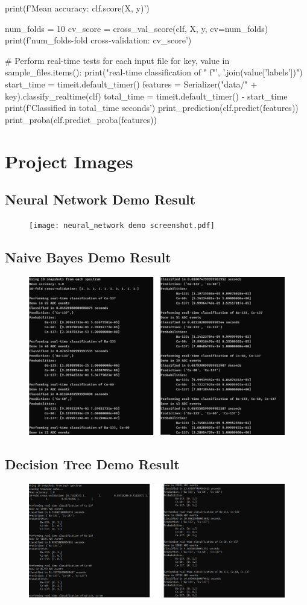 \documentclass[onecolumn, draftclsnofoot,10pt, compsoc]{IEEEtran}
\begin{document}
\begin{python}
print(f'Mean accuracy: {clf.score(X, y)}')

num_folds = 10
cv_score = cross_val_score(clf, X, y, cv=num_folds)
print(f'{num_folds}-fold cross-validation: {cv_score}')

# Perform real-time tests for each input file
for key, value in sample_files.items():
    print("\nPerforming real-time classification of "
          f"{', '.join(value['labels'])}")
    start_time = timeit.default_timer()
    features = Serializer("data/" + key).classify_realtime(clf)
    total_time = timeit.default_timer() - start_time
    print(f'Classified in {total_time} seconds')
    print_prediction(clf.predict(features))
    print_proba(clf.predict_proba(features))
\end{python}

\section{Project Images}
\subsection{Neural Network Demo Result}
\begin{figure}[H]
    \texttt{[image: neural\_network demo screenshot.pdf]}
\end{figure}

\subsection{Naive Bayes Demo Result}
\begin{figure}[H]
    \includegraphics[width=\linewidth]{naive-bayes-demo-split.png}
\end{figure}

\subsection{Decision Tree Demo Result}
\begin{figure}[H]
    \includegraphics[width=\linewidth]{decision-tree-demo-split.png}
\end{figure}
\end{document}
